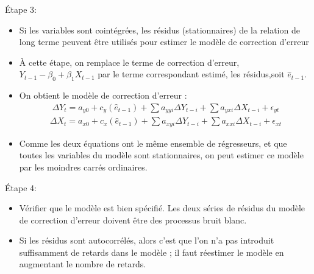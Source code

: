 \documentclass{beamer}
\begin{document}
\begin{frame}{Étape 3:}
\begin{itemize}
\item Si les variables sont cointégrées, les résidus (stationnaires) de la relation de long terme peuvent être utilisés pour estimer le modèle de correction d’erreur
\item À cette étape, on remplace le terme de correction d’erreur, $Y_{t-1}-\beta_0+\beta_1 X_{t-1}$ par le terme correspondant estimé, les résidus,soit $\hat{e}_{t-1}$.
\item On obtient le modèle de correction d’erreur :
\begin{align*}
\Delta Y_t=a_{y0}+c_y(\hat{e}_{t-1})+\sum a_{yyi}\Delta Y_{t-i}+\sum a_{yxi} \Delta X_{t-i}+\epsilon_{yt}
\end{align*}
\begin{align*}
\Delta X_t=a_{x0}+c_x(\hat{e}_{t-1})+\sum a_{xyi}\Delta Y_{t-i}+\sum a_{xxi} \Delta X_{t-i}+\epsilon_{xt}
\end{align*}
\item Comme les deux équations ont le même ensemble de régresseurs, et que toutes les variables du modèle sont stationnaires, on peut estimer ce modèle par les moindres carrés ordinaires.
\end{itemize}
\end{frame}


\begin{frame}{Étape 4:}
\begin{itemize}
\item Vérifier que le modèle est bien spécifié. Les deux séries de résidus du modèle de correction d’erreur doivent être des processus bruit blanc.
\item Si les résidus sont autocorrélés, alors c’est que l’on n’a pas introduit suffisamment de retards dans le modèle ; il faut réestimer le modèle en augmentant le nombre de retards.
\end{itemize}
\end{frame}
\end{document}
